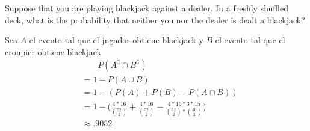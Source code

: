\item Suppose that you are playing blackjack against a dealer. In a freshly shuffled deck, what is the probability that neither you nor the dealer is dealt a blackjack?

Sea $A$ el evento tal que el jugador obtiene blackjack y $B$ el evento tal que el croupier obtiene blackjack
\begin{align*}
    &\phantom{\;=\;} P(A^\complement \cap B^\complement )\\
    &= 1 - P(A \cup B)\\
    &= 1 - (P(A) + P(B) - P(A\cap B))\\
    &= 1 
    - \Bigg (\frac{4 * 16}{\binom{52}{2}} + \frac{4 * 16}{\binom{52}{2}} 
    - \frac{4 * 16 * 3 * 15}{\binom{52}{2} * \binom{50}{2}}\Bigg )\\
    &\approx .9052
\end{align*}